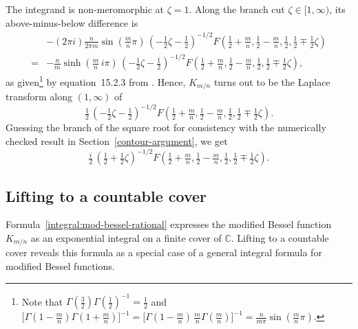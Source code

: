 \documentclass{article}
\theoremstyle{plain}
\newcommand{\C}{\mathbb{C}}
\begin{document}
The integrand is non-meromorphic at $\zeta = 1$. Along the branch cut $\zeta \in [1, \infty)$, its above-minus-below difference is
\begin{align*}
& -(2\pi i)\tfrac{n}{2\pi m} \sin(\tfrac{m}{n} \pi)\,(-\tfrac{1}{2}\zeta - \tfrac{1}{2})^{-1/2} F(\tfrac{1}{2} + \tfrac{m}{n}, \tfrac{1}{2} - \tfrac{m}{n}, \tfrac{1}{2}, \tfrac{1}{2} \mp \tfrac{1}{2}\zeta) \\
= & -\tfrac{n}{m} \sinh(\tfrac{m}{n}\,i\pi)\,(-\tfrac{1}{2}\zeta - \tfrac{1}{2})^{-1/2} F(\tfrac{1}{2} + \tfrac{m}{n}, \tfrac{1}{2} - \tfrac{m}{n}, \tfrac{1}{2}, \tfrac{1}{2} \mp \tfrac{1}{2}\zeta),
\end{align*}
as given\footnote{Note that $\Gamma(\tfrac{3}{2}) \Gamma(\tfrac{1}{2})^{-1} = \tfrac{1}{2}$ and $\big[\Gamma(1 - \tfrac{m}{n})\Gamma(1 + \tfrac{m}{n})\big]^{-1} = \big[\Gamma(1 - \tfrac{m}{n})\,\tfrac{m}{n}\Gamma(\tfrac{m}{n})\big]^{-1} = \tfrac{n}{m\pi} \sin(\tfrac{m}{n} \pi)$.} by equation~15.2.3 from \cite{dlmf}. Hence, $K_{m/n}$ turns out to be the Laplace transform along $(1, \infty)$ of
\[ \tfrac{1}{2}\,(-\tfrac{1}{2}\zeta - \tfrac{1}{2})^{-1/2} F(\tfrac{1}{2} + \tfrac{m}{n}, \tfrac{1}{2} - \tfrac{m}{n}, \tfrac{1}{2}, \tfrac{1}{2} \mp \tfrac{1}{2}\zeta). \]
\color{DarkCyan}
Guessing the branch of the square root for consistency with the numerically checked result in Section~\ref{contour-argument}, we get
\[ \tfrac{i}{2}\,(\tfrac{1}{2} + \tfrac{1}{2}\zeta)^{-1/2} F(\tfrac{1}{2} + \tfrac{m}{n}, \tfrac{1}{2} - \tfrac{m}{n}, \tfrac{1}{2}, \tfrac{1}{2} \mp \tfrac{1}{2}\zeta). \]
\color{black}
\subsection{Lifting to a countable cover}
Formula~\ref{integral:mod-bessel-rational} expresses the modified Bessel function $K_{m/n}$ as an exponential integral on a finite cover of $\C$. Lifting to a countable cover reveals this formula as a special case of a general integral formula for modified Bessel functions.
\end{document}
